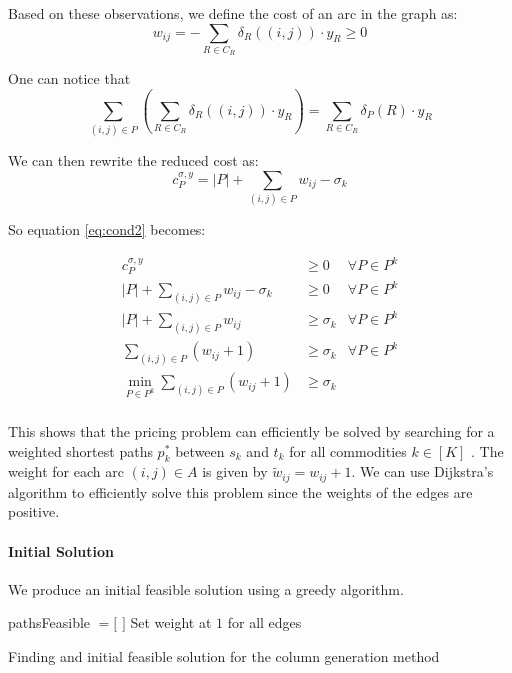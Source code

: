 \documentclass[14pt,a4paper]{article}
\theoremstyle{definition}
\numberwithin{equation}{subsection}
\begin{document}
Based on these observations, we define the cost of an arc in the graph as:
\begin{equation*}
w_{ij} = -\sum_{R \in C_R} \delta_R((i,j))\cdot y_R \geq 0
\end{equation*}

One can notice that 
$$ \sum_{(i,j)\in P}\left(\sum_{R \in C_R} \delta_R((i,j))\cdot y_R \right)=   \sum\limits_{R \in C_R}    \delta_P(R)\cdot y_R$$



We can then rewrite the reduced cost as: 
$$ c_P^{\sigma,y} = |P| + \sum\limits_{(i,j) \in P}  w_{ij} -\sigma_k $$

So equation \eqref{eq:cond2} becomes:

\begin{eqnarray*}
		c_P^{\sigma,y} & \geq 0 &\forall P \in P^k\\
		|P| + \sum\limits_{(i,j) \in P}  w_{ij} -\sigma_k & \geq 0 &\forall P \in P^k\\
		|P| + \sum\limits_{(i,j) \in P}  w_{ij}  & \geq \sigma_k &\forall P \in P^k\\
		\sum\limits_{(i,j) \in P} \left( w_{ij} + 1\right)  & \geq \sigma_k &\forall P \in P^k\\
		\min_{P\in P^k}\sum\limits_{(i,j) \in P} \left( w_{ij} + 1\right)  & \geq \sigma_k & \\
\end{eqnarray*}


This shows that the pricing problem can efficiently be solved by searching for a weighted shortest paths $p^*_k$ between $s_k$ and $t_k$ for all commodities $k \in [K]$ . The weight for each arc $(i,j)\in A$ is given by $\tilde{w}_{ij} = w_{ij}+1$. We can use Dijkstra's algorithm to efficiently solve this problem since the weights of the edges are positive.





\paragraph{Initial Solution}
We produce an initial feasible solution using a greedy algorithm.\\


\begin{algorithm}[H]
	\SetAlgoLined
	pathsFeasible $= [$  $]$\;
	Set weight at $1$ for all edges\;
	
	
	\caption{Finding and initial feasible solution for the column generation method}
\end{algorithm}
\end{document}
